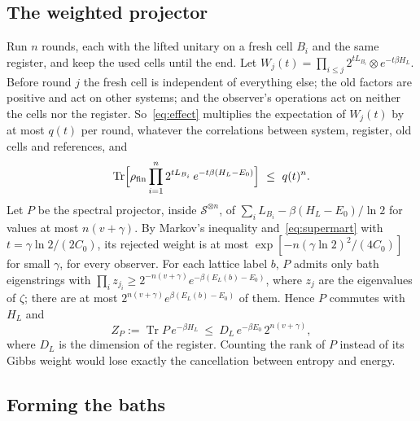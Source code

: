 \documentclass[11pt]{article}
\theoremstyle{definition}
\theoremstyle{remark}
\newcommand{\Tr}{\operatorname{Tr}}
\begin{document}
\subsection{The weighted projector}

Run $n$ rounds, each with the lifted unitary on a fresh cell $B_i$ and the same register, and keep the used cells until the end. Let $W_j(t)=\prod_{i\le j}2^{tL_{B_i}}\otimes e^{-t\beta H_L}$. Before round $j$ the fresh cell is independent of everything else; the old factors are positive and act on other systems; and the observer's operations act on neither the cells nor the register. So~\eqref{eq:effect} multiplies the expectation of $W_j(t)$ by at most $q(t)$ per round, whatever the correlations between system, register, old cells and references, and
\begin{equation}\label{eq:supermart}
\Tr\Bigl[\rho_{\mathrm{fin}}\prod_{i=1}^n2^{tL_{B_i}}\,e^{-t\beta(H_L-E_0)}\Bigr]\ \le\ q(t)^n.
\end{equation}
Let $P$ be the spectral projector, inside $\mathcal S^{\otimes n}$, of $\sum_iL_{B_i}-\beta(H_L-E_0)/\ln2$ for values at most $n(v+\gamma)$. By Markov's inequality and~\eqref{eq:supermart} with $t=\gamma\ln2/(2C_0)$, its rejected weight is at most $\exp[-n(\gamma\ln2)^2/(4C_0)]$ for small $\gamma$, for every observer. For each lattice label $b$, $P$ admits only bath eigenstrings with $\prod_iz_{j_i}\ge2^{-n(v+\gamma)}e^{-\beta(E_L(b)-E_0)}$, where $z_j$ are the eigenvalues of $\zeta$; there are at most $2^{n(v+\gamma)}e^{\beta(E_L(b)-E_0)}$ of them. Hence $P$ commutes with $H_L$ and
\begin{equation}\label{eq:gibbsvolume}
Z_P:=\Tr P\,e^{-\beta H_L}\ \le\ D_L\,e^{-\beta E_0}\,2^{n(v+\gamma)},
\end{equation}
where $D_L$ is the dimension of the register. Counting the rank of $P$ instead of its Gibbs weight would lose exactly the cancellation between entropy and energy.

\subsection{Forming the baths}
\end{document}
